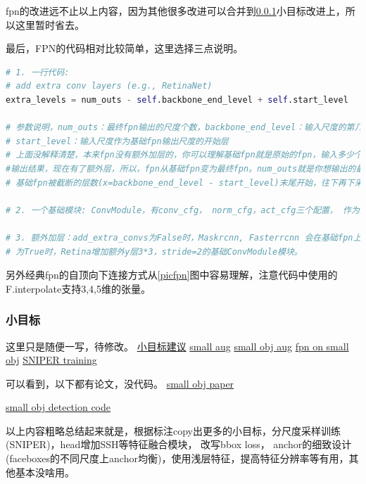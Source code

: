 \documentclass[UTF8]{ctexart}
\begin{document}
fpn的改进远不止以上内容，因为其他很多改进可以合并到\ref{smallobj}小目标改进上，所以这里暂时省去。

最后，FPN的代码相对比较简单，这里选择三点说明。

\lstset{style=mystyle}
\begin{lstlisting}[language=Python]
# 1. 一行代码:
# add extra conv layers (e.g., RetinaNet)
extra_levels = num_outs - self.backbone_end_level + self.start_level

# 参数说明，num_outs：最终fpn输出的尺度个数，backbone_end_level：输入尺度的第几层作为基础fpn输出的最后一层，
# start_level：输入尺度作为基础fpn输出尺度的开始层
# 上面没解释清楚，本来fpn没有额外加层的，你可以理解基础fpn就是原始的fpn，输入多少个层，选一个开始和结束，作为截断就是
#输出结果，现在有了额外层，所以，fpn从基础fpn变为最终fpn。num_outs就是你想输出的最终尺度个数，额外差的尺度特征，从
# 基础fpn被截断的层数(x=backbone_end_level - start_level)末尾开始，往下再下采样y=num_outs-x)即得到最终的fpn特征。

# 2. 一个基础模块: ConvModule，有conv_cfg， norm_cfg，act_cfg三个配置， 作为最小卷积配置单元，注意一下。

# 3. 额外加层：add_extra_convs为False时，Maskrcnn, Fasterrcnn 会在基础fpn上外增加num_outs - used_backbone_levels(x,如上)个max_pool层，
# 为True时，Retina增加额外y层3*3，stride=2的基础ConvModule模块。
\end{lstlisting}

另外经典fpn的自顶向下连接方式从\ref{picfpn}图中容易理解，注意代码中使用的F.interpolate支持3,4,5维的张量。


\subsubsection{小目标}
\label{smallobj}
这里只是随便一写，待修改。
\href{https://www.zhihu.com/question/272322209}{小目标建议}
\href{https://arxiv.org/abs/1902.07296}{small aug}
\href{https://blog.aigrant.org/ai-grant-research-small-object-detection-8e7f71408096}{small obj aug}
\href{https://arxiv.org/abs/2003.07021}{fpn on small obj}
\href{https://arxiv.org/abs/1805.09300}{SNIPER training}

可以看到，以下都有论文，没代码。
\href{https://paperswithcode.com/task/small-object-detection/codeless}{small obj paper}

\href{https://paperswithcode.com/task/small-object-detection}{small obj detection code}

以上内容粗略总结起来就是，根据标注copy出更多的小目标，分尺度采样训练(SNIPER)，head增加SSH等特征融合模块，
改写bbox loss， anchor的细致设计(faceboxes的不同尺度上anchor均衡)，使用浅层特征，提高特征分辨率等有用，其他基本没啥用。
\end{document}
